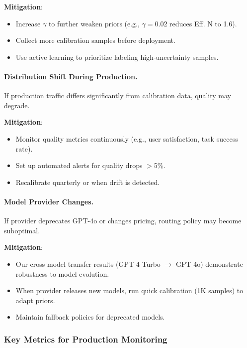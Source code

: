 \textbf{Mitigation}: 
\begin{itemize}
    \item Increase $\gamma$ to further weaken priors (e.g., $\gamma=0.02$ reduces Eff. N to 1.6).
    \item Collect more calibration samples before deployment.
    \item Use active learning to prioritize labeling high-uncertainty samples.
\end{itemize}

\paragraph{Distribution Shift During Production.} If production traffic differs significantly from calibration data, quality may degrade.

\textbf{Mitigation}:
\begin{itemize}
    \item Monitor quality metrics continuously (e.g., user satisfaction, task success rate).
    \item Set up automated alerts for quality drops $>$5\%.
    \item Recalibrate quarterly or when drift is detected.
\end{itemize}

\paragraph{Model Provider Changes.} If provider deprecates GPT-4o or changes pricing, routing policy may become suboptimal.

\textbf{Mitigation}:
\begin{itemize}
    \item Our cross-model transfer results (GPT-4-Turbo $\rightarrow$ GPT-4o) demonstrate robustness to model evolution.
    \item When provider releases new models, run quick calibration (1K samples) to adapt priors.
    \item Maintain fallback policies for deprecated models.
\end{itemize}

\subsubsection{Key Metrics for Production Monitoring}

